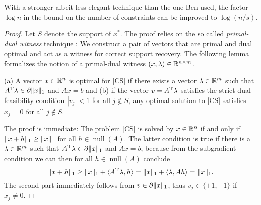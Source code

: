 \documentclass{article} %
\renewcommand{\null}{\operatorname{null}}
\begin{document}
With a stronger albeit less elegant technique than the one Ben used, the factor $\log n$ in the bound on the number of constraints can be improved to $\log(n/s)$.
\begin{proof}
Let $S$ denote the support of $x^*$. The proof relies on the so called \emph{primal-dual witness} technique \cite{Wainwright2009}: We construct a pair of vectors that are primal and dual optimal and act as a witness for correct support recovery.
The following lemma formalizes the notion of a primal-dual witness $(x, \lambda)\in \mathbb{R}^{n\times m}$.
\begin{lemma}
  (a) A vector $x \in \mathbb{R}^n$ is optimal for \eqref{CS} if there exists
  a vector $\lambda\in \mathbb{R}^m$ such that $A^{\rm T} \lambda\in \partial
  \lVert x\rVert_1$ and $Ax = b$ and (b) if the vector $v = A^{\rm T} \lambda$
  satisfies the strict dual feasibility condition $|v_j| < 1$
  for all $j\not\in S$, any optimal solution to \eqref{CS} satisfies
  $x_j = 0$ for all $j\not\in S$.
\end{lemma}
The proof is immediate: The problem \eqref{CS} is solved by $x\in
\mathbb{R}^n$ if and only if $\lVert x + h\rVert_1 \geq \lVert x\rVert_1$ for all $h\in \null(A)$.
The latter condition is true if there is a $\lambda \in \mathbb{R}^m$ such
that $A^{\rm T} \lambda \in \partial \lVert x\rVert_1$ and $Ax = b$, because from
the subgradient condition we can then for all $h\in \null(A)$ conclude
\begin{equation*}
\lVert x + h\rVert_1 \geq \lVert x\rVert_1 + \langle A^{\rm T} \lambda, h\rangle = \lVert x\rVert_1 +
  \langle\lambda, A h\rangle = \lVert x\rVert_1.
\end{equation*}
The second part immediately follows from $v \in \partial\lVert x\rVert_1$,
thus $v_j \in \{+1, -1\}$ if $x_j \neq 0$. \qedhere


\end{proof}
\end{document}
